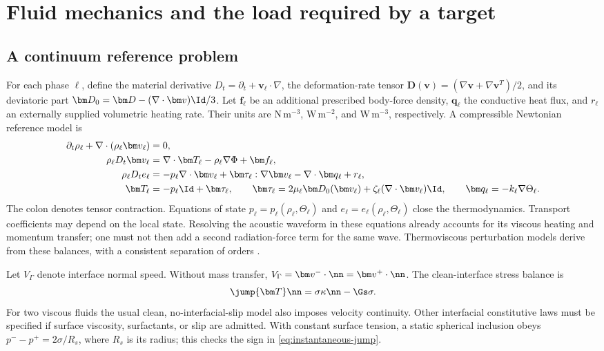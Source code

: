 \section{Fluid mechanics and the load required by a target}\label{sec:mechanics}

\subsection{A continuum reference problem}
For each phase $\ell$, define the material derivative
$D_t=\partial_t+\bm v_\ell\cdot\nabla$, the deformation-rate tensor
$\bm D(\bm v)=(\nabla\bm v+\nabla\bm v^T)/2$, and its deviatoric part
$\bm D_0=\bm D-(\nabla\cdot\bm v)\Id/3$. Let $\bm f_\ell$ be an additional
prescribed body-force density, $\bm q_\ell$ the conductive heat flux, and
$r_\ell$ an externally supplied volumetric heating rate. Their units are
$\mathrm{N\,m^{-3}}$, $\mathrm{W\,m^{-2}}$, and $\mathrm{W\,m^{-3}}$,
respectively. A compressible Newtonian reference model is
\begin{align}
 \partial_t\rho_\ell+\nabla\cdot(\rho_\ell\bm v_\ell)&=0,
 \label{eq:mass}\\
 \rho_\ell D_t\bm v_\ell
 &=\nabla\cdot\bm T_\ell-\rho_\ell\nabla\Phi+\bm f_\ell,
 \label{eq:momentum}\\
 \rho_\ell D_te_\ell
 &=-p_\ell\nabla\cdot\bm v_\ell
   +\bm\tau_\ell:\nabla\bm v_\ell-\nabla\cdot\bm q_\ell+r_\ell,
 \label{eq:internal-energy}\\
 \bm T_\ell&=-p_\ell\Id+\bm\tau_\ell,\qquad
 \bm\tau_\ell=2\mu_\ell\bm D_0(\bm v_\ell)
                +\zeta_\ell(\nabla\cdot\bm v_\ell)\Id,
 \qquad \bm q_\ell=-k_\ell\nabla\Theta_\ell.
 \label{eq:constitutive}
\end{align}
The colon denotes tensor contraction. Equations of state
$p_\ell=p_\ell(\rho_\ell,\Theta_\ell)$ and
$e_\ell=e_\ell(\rho_\ell,\Theta_\ell)$ close the thermodynamics. Transport
coefficients may depend on the local state. Resolving the acoustic waveform in
these equations already accounts for its viscous heating and momentum transfer;
one must not then add a second radiation-force term for the same wave.
Thermoviscous perturbation models derive from these balances, with a consistent
separation of orders \cite{jorgensen2021}.

Let $V_\Gamma$ denote interface normal speed. Without mass transfer,
$V_\Gamma=\bm v^-\cdot\nn=\bm v^+\cdot\nn$. The clean-interface stress balance
is
\begin{equation}
 \jump{\bm T}\nn=\sigma\kappa\nn-\Gs\sigma.
 \label{eq:instantaneous-jump}
\end{equation}
For two viscous fluids the usual clean, no-interfacial-slip model also imposes
velocity continuity. Other interfacial constitutive laws must be specified if
surface viscosity, surfactants, or slip are admitted. With constant surface
tension, a static spherical inclusion obeys
$p^- -p^+=2\sigma/R_s$, where $R_s$ is its radius; this checks the sign in
\cref{eq:instantaneous-jump}.

